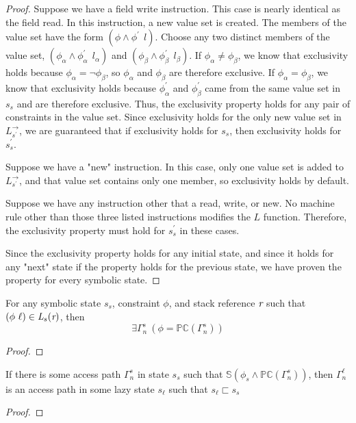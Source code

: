 \begin{proof}
Suppose we have a field write instruction. This case is nearly identical as the field read. In this instruction, a new value set is created. The members of the value set have the form $(\phi\wedge \phi^\prime\ \ l)$. Choose any two distinct members of the value set, $(\phi_\alpha \wedge \phi_\alpha^\prime\ \ l_\alpha)$ and $(\phi_\beta \wedge \phi_\beta^\prime\ \ l_\beta)$. If $\phi_\alpha \ne \phi_\beta$, we know that exclusivity holds because $\phi_\alpha = \neg \phi_\beta$, so $\phi_\alpha$ and $\phi_\beta$ are therefore exclusive. If $\phi_\alpha = \phi_\beta$, we know that exclusivity holds because $\phi_\alpha^\prime$ and $\phi_\beta^\prime$ came from the same value set in $s_s$ and are therefore exclusive. Thus, the exclusivity property holds for any pair of constraints in the value set. Since exclusivity holds for the only new value set in $L_{s^\prime}^\rightarrow$, we are guaranteed that if exclusivity holds for $s_s$, then exclusivity holds for $s_s^\prime$.

Suppose we have a "new" instruction. In this case, only one value set is added to $L_{s^\prime}^\rightarrow$, and that value set contains only one member, so exclusivity holds by default.

Suppose we have any instruction other that a read, write, or new. No machine rule other than those three listed instructions modifies the $L$ function. Therefore, the exclusivity property must hold for $s_s^\prime$ in these cases.

Since the exclusivity property holds for any initial state, and since it holds for any "next" state if the property holds for the previous state, we have proven the property for every symbolic state.
\end{proof}

\begin{lemma}
\label{lem:ref}
For any symbolic state $s_s$, constraint $\phi$, and stack reference $\emph{r}$ such that $(\phi\ \ell) \in \emph{L}_s (\emph{r})$, then 
\begin{equation}
\exists \Gamma_n^s\ ( \phi = \mathbb{PC} (\Gamma_n^s) )
\end{equation}
\end{lemma}
\begin{proof}
\end{proof}

\begin{lemma}
\label{lem:path}
If there is some access path $\Gamma_n^s$ in state $s_s$ such that $\mathbb{S}(\phi_s \wedge \mathbb{PC}(\Gamma_n^s))$, then $\Gamma_n^\ell$ is an access path in some lazy state $s_\ell$ such that $s_\ell \sqsubset s_s$
\end{lemma}
\begin{proof}
\end{proof}

